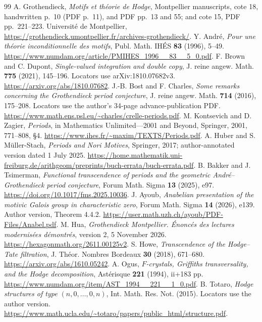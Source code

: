 \documentclass[11pt]{article}
\theoremstyle{definition}\newtheorem{definition}[theorem]{Definition}
\theoremstyle{remark}\newtheorem{remark}[theorem]{Remark}
\begin{document}
\begin{thebibliography}{99}
 A. Grothendieck, \emph{Motifs et th\'eorie de Hodge}, Montpellier manuscripts, cote 18, handwritten p.~10 (PDF p.~11), and PDF pp.~13 and 55; and cote 15, PDF pp.~221--223. Universit\'e de Montpellier, \url{https://grothendieck.umontpellier.fr/archives-grothendieck/}.
 Y. Andr\'e, \emph{Pour une th\'eorie inconditionnelle des motifs}, Publ. Math. IH\'ES \textbf{83} (1996), 5--49. \url{https://www.numdam.org/article/PMIHES_1996__83__5_0.pdf}.
 F. Brown and C. Dupont, \emph{Single-valued integration and double copy}, J. reine angew. Math. \textbf{775} (2021), 145--196. Locators use arXiv:1810.07682v3. \url{https://arxiv.org/abs/1810.07682}.
 J.-B. Bost and F. Charles, \emph{Some remarks concerning the Grothendieck period conjecture}, J. reine angew. Math. \textbf{714} (2016), 175--208. Locators use the author's 34-page advance-publication PDF. \url{https://www.math.ens.psl.eu/~charles/crelle-periods.pdf}.
 M. Kontsevich and D. Zagier, \emph{Periods}, in Mathematics Unlimited---2001 and Beyond, Springer, 2001, 771--808, \S4. \url{https://www.ihes.fr/~maxim/TEXTS/Periods.pdf}.
 A. Huber and S. M\"uller-Stach, \emph{Periods and Nori Motives}, Springer, 2017; author-annotated version dated 1 July 2025. \url{https://home.mathematik.uni-freiburg.de/arithgeom/preprints/buch-errata/buch-errata.pdf}.
 B. Bakker and J. Tsimerman, \emph{Functional transcendence of periods and the geometric Andr\'e--Grothendieck period conjecture}, Forum Math. Sigma \textbf{13} (2025), e97. \url{https://doi.org/10.1017/fms.2025.10036}.
 J. Ayoub, \emph{Anabelian presentation of the motivic Galois group in characteristic zero}, Forum Math. Sigma \textbf{14} (2026), e139. Author version, Theorem 4.4.2. \url{https://user.math.uzh.ch/ayoub/PDF-Files/Anabel.pdf}.
 M. Hua, \emph{Grothendieck Montpellier. \'Enonc\'es des lectures modernis\'ees d\'emontr\'es}, version 2, 5 November 2026. \url{https://hexagonmath.org/2611.00125v2}.
 S. Howe, \emph{Transcendence of the Hodge--Tate filtration}, J. Th\'eor. Nombres Bordeaux \textbf{30} (2018), 671--680. \url{https://arxiv.org/abs/1610.05242}.
 A. Ogus, \emph{$F$-crystals, Griffiths transversality, and the Hodge decomposition}, Ast\'erisque \textbf{221} (1994), ii+183 pp. \url{https://www.numdam.org/item/AST_1994__221__1_0.pdf}.
 B. Totaro, \emph{Hodge structures of type $(n,0,\ldots,0,n)$}, Int. Math. Res. Not. (2015). Locators use the author version. \url{https://www.math.ucla.edu/~totaro/papers/public_html/structure.pdf}.

\end{thebibliography}
\end{document}
